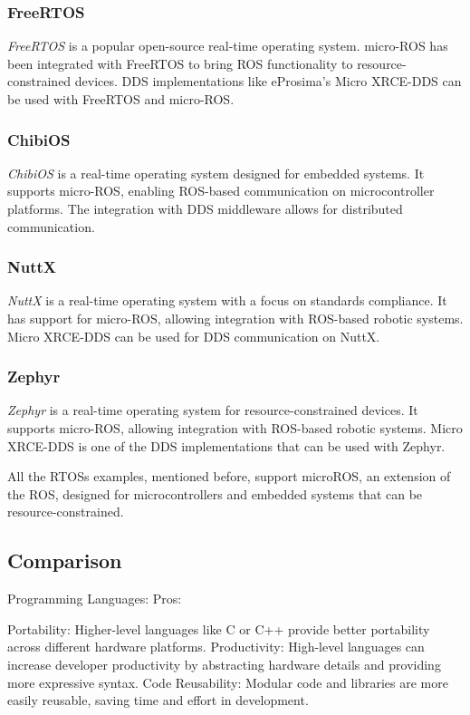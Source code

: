 \subsubsection{FreeRTOS}
\textit{FreeRTOS} is a popular open-source real-time operating system.
micro-ROS has been integrated with FreeRTOS to bring ROS functionality to resource-constrained devices.
DDS implementations like eProsima's Micro XRCE-DDS can be used with FreeRTOS and micro-ROS.

\subsubsection{ChibiOS}
\textit{ChibiOS} is a real-time operating system designed for embedded systems.
It supports micro-ROS, enabling ROS-based communication on microcontroller platforms.
The integration with DDS middleware allows for distributed communication.

\subsubsection{NuttX}
\textit{NuttX} is a real-time operating system with a focus on standards compliance.
It has support for micro-ROS, allowing integration with ROS-based robotic systems.
Micro XRCE-DDS can be used for DDS communication on NuttX.

\subsubsection{Zephyr}
\textit{Zephyr} is a real-time operating system for resource-constrained devices.
It supports micro-ROS, allowing integration with ROS-based robotic systems.
Micro XRCE-DDS is one of the DDS implementations that can be used with Zephyr.

All the \glspl{RTOS} examples, mentioned before, support microROS, an extension of the \gls{ROS}, designed for microcontrollers and embedded systems that can be resource-constrained.

\subsection{Comparison}
Programming Languages:
Pros:

Portability: Higher-level languages like C or C++ provide better portability across different hardware platforms.
Productivity: High-level languages can increase developer productivity by abstracting hardware details and providing more expressive syntax.
Code Reusability: Modular code and libraries are more easily reusable, saving time and effort in development.

